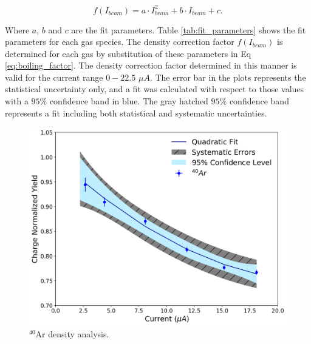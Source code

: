 \documentclass[final,5p,times,twocolumn]{elsarticle}
\begin{document}
\begin{equation}
f(I_{beam}) = a\cdot I_{beam}^{2} + b \cdot I_{beam} + c.
\label{eq:boiling_factor}
\end{equation}

\noindent Where $a$, $b$ and $c$ are the fit parameters. Table \ref{tab:fit_parameters} shows the fit parameters for each gas species. The density correction factor $f(I_{beam})$ is determined for each gas by substitution of these parameters in Eq \ref{eq:boiling_factor}. The density correction factor determined in this manner is valid for the current range $0-22.5$ $\mu A$. The error bar in the plots represents the statistical uncertainty only, and a fit was calculated with respect to those values with a $95\%$ confidence band in blue. The gray hatched $95\%$ confidence band represents a fit including both statistical and systematic uncertainties.

\begin{figure}[!h]
	\centering
	\includegraphics[width=\linewidth]{argon_data.pdf}
	\caption{$^{40}$Ar density analysis.}
	\label{fig:argon_data}
\end{figure}
\end{document}
